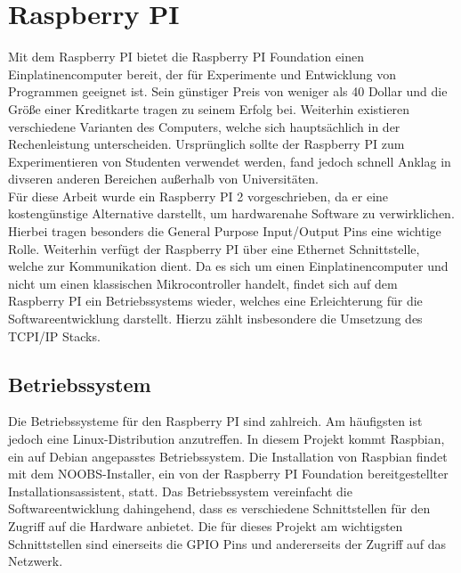 \chapter{Raspberry PI}
Mit dem Raspberry PI bietet die Raspberry PI Foundation einen Einplatinencomputer bereit, der für Experimente und Entwicklung von Programmen geeignet ist. Sein günstiger Preis von weniger als 40 Dollar und die Größe einer Kreditkarte tragen zu seinem Erfolg bei. Weiterhin existieren verschiedene Varianten des Computers, welche sich hauptsächlich in der Rechenleistung unterscheiden. Ursprünglich sollte der Raspberry PI zum Experimentieren von Studenten verwendet werden, fand jedoch schnell Anklag in divseren anderen Bereichen außerhalb von Universitäten.\\ %
Für diese Arbeit wurde ein Raspberry PI 2 vorgeschrieben, da er eine kostengünstige Alternative darstellt, um hardwarenahe Software zu verwirklichen. Hierbei tragen besonders die General Purpose Input/Output Pins eine wichtige Rolle. Weiterhin verfügt der Raspberry PI über eine Ethernet Schnittstelle, welche zur Kommunikation dient. Da es sich um einen Einplatinencomputer und nicht um einen klassischen Mikrocontroller handelt, findet sich auf dem Raspberry PI ein Betriebssystems wieder, welches eine Erleichterung für die Softwareentwicklung darstellt. Hierzu zählt insbesondere die Umsetzung des TCPI/IP Stacks.\\ %

\section{Betriebssystem}
Die Betriebssysteme für den Raspberry PI sind zahlreich. Am häufigsten ist jedoch eine Linux-Distribution anzutreffen. In diesem Projekt kommt Raspbian, ein auf Debian angepasstes Betriebssystem. Die Installation von Raspbian findet mit dem NOOBS-Installer, ein von der Raspberry PI Foundation bereitgestellter Installationsassistent, statt. %
Das Betriebssystem vereinfacht die Softwareentwicklung dahingehend, dass es verschiedene Schnittstellen für den Zugriff auf die Hardware anbietet. Die für dieses Projekt am wichtigsten Schnittstellen sind einerseits die GPIO Pins und andererseits der Zugriff auf das Netzwerk.

